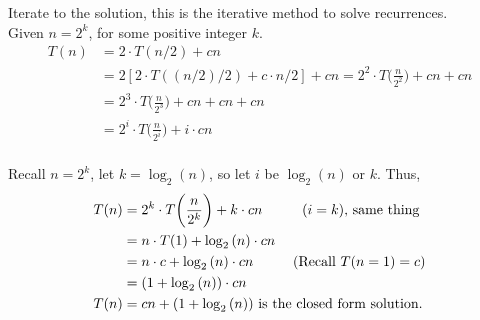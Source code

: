 \documentclass{article}
\begin{document}
Iterate to the solution, this is the iterative method to solve recurrences.\\
Given $n=2^k$, for some positive integer $k$.
\begin{equation*}
\begin{split}
  T(n) & = 2 \cdot T(n/2) + cn\\
  & = 2[2 \cdot T((n/2)/2) + c \cdot n/2] + cn = 2^2 \cdot T\bigg(\frac{n}{2^2}\bigg)+cn+cn\\
  & = 2^3 \cdot T\bigg(\frac{n}{2^3}\bigg)+cn+cn+cn\\
  & = 2^i \cdot T\bigg(\frac{n}{2^i}\bigg)+i \cdot cn\\
\end{split}
\end{equation*}

Recall $n=2^k$, let $k=\log_2{(n)}$, so let $i$ be $\log_2{(n)}$ or $k$. Thus,\\

\begin{equation*}
\begin{split}
  T(n) & = 2^k \cdot T\bigg(\frac{n}{2^k}\bigg) + k \cdot cn \text{\hspace{10mm}($i=k$), same thing}\\
  & = n \cdot T(1) + \log_2{(n)} \cdot cn\\
  & = n \cdot c + \log_2{(n)} \cdot cn \text{\hspace{10mm}(Recall $T(n=1) = c$)}\\
  & = (1 + \log_2{(n)}) \cdot cn\\
  T(n) & = cn + (1 + \log_2{(n)}) \text{ is the closed form solution.}
\end{split}
\end{equation*}
\end{document}
